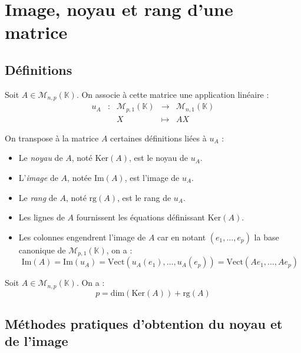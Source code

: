 \documentclass[french,11pt,twoside]{VcCours}
\begin{document}
\section{Image, noyau et rang d'une matrice}
\subsection{Définitions}
Soit $A \in \mathcal{M}_{n,p}(\mathbb{K})$. On associe à cette matrice une application linéaire :
$$ \begin{array}{ccccl}
u_A & : & \mathcal{M}_{p,1}(\mathbb{K}) & \rightarrow & \mathcal{M}_{n,1}(\mathbb{K}) \\
& & X & \mapsto & AX
\end{array}$$

\begin{Definition}{} On transpose à la matrice $A$ certaines définitions liées à $u_A$ :
\begin{itemize}
\item Le \emph{noyau} de $A$, noté $\textrm{Ker}(A)$, est le noyau de $u_A$.
\item L'\emph{image} de $A$, notée $\textrm{Im}(A)$, est l'image de $u_A$.
\item Le \emph{rang} de $A$, noté $\textrm{rg}(A)$, est le rang de $u_A$.
\end{itemize}
\end{Definition}

\begin{Remarques}{}
\begin{itemize}
\item Les lignes de $A$ fournissent les équations définissant $\textrm{Ker}(A)$.
\item Les colonnes engendrent l'image de $A$ car en notant $(e_1, \ldots, e_p)$ la base canonique de $ \mathcal{M}_{p,1}(\mathbb{K}) $, on a :
$$ \textrm{Im}(A) = \textrm{Im}(u_A) = \textrm{Vect}(u_A(e_1), \ldots, u_A(e_p))= \textrm{Vect}(Ae_1, \ldots, Ae_p)$$
\end{itemize}
\end{Remarques}{}

\begin{Theoreme}{} Soit $A \in \mathcal{M}_{n,p}(\mathbb{K})$. On a :
$$ p = \textrm{dim}(\textrm{Ker}(A)) + \textrm{rg}(A)$$
\end{Theoreme}

\subsection{Méthodes pratiques d'obtention du noyau et de l'image}
\end{document}
